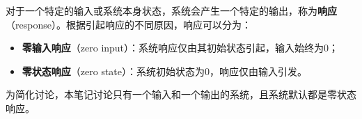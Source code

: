 \begin{definition}[响应]
对于一个特定的输入或系统本身状态，系统会产生一个特定的输出，称为{\bf 响应}（response）。根据引起响应的不同原因，响应可以分为：
\begin{itemize}
    \item {\bf 零输入响应}（zero input）：系统响应仅由其初始状态引起，输入始终为0；
    \item {\bf 零状态响应}（zero state）：系统初始状态为0，响应仅由输入引发。
\end{itemize}
\end{definition}

\begin{tcolorbox}
为简化讨论，本笔记讨论只有一个输入和一个输出的系统，且系统默认都是零状态响应。
\end{tcolorbox}







